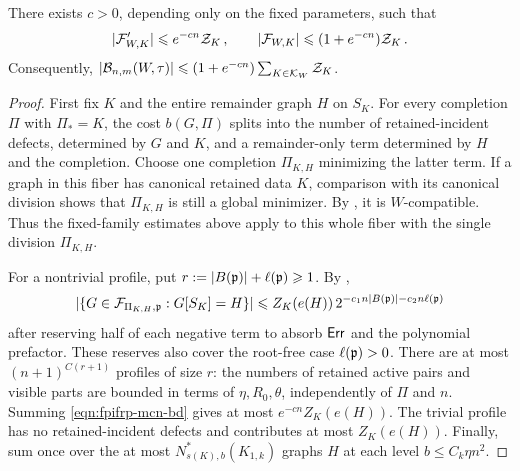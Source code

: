 \begin{lemma}\label{lemma:NtaunmWUpperBdK1k}
There exists $c>0$, depending only on the fixed parameters, such that
$$|{\mathcal F}'_{W,K}|\leqslant e^{-cn}{\mathcal Z}_K\,,\qquad |{\mathcal F}_{W,K}|\leqslant(1+e^{-cn}){\mathcal Z}_K\,.$$
Consequently, $|{\mathcal B}_{n,m}(W,\tau)|\leqslant(1+e^{-cn})\sum_{K\in{\mathcal K}_W}{\mathcal Z}_K$.
\end{lemma}
\begin{proof}
First fix $K$ and the entire remainder graph $H$ on $S_K$. For every completion $\Pi$ with $\Pi_\ast=K$, the cost $b(G,\Pi)$ splits into the number of retained-incident defects, determined by $G$ and $K$, and a remainder-only term determined by $H$ and the completion. Choose one completion $\Pi_{K,H}$ minimizing the latter term. If a graph in this fiber has canonical retained data $K$, comparison with its canonical division shows that $\Pi_{K,H}$ is still a global minimizer. By , it is $W$-compatible. Thus the fixed-family estimates above apply to this whole fiber with the single division $\Pi_{K,H}$.

For a nontrivial profile, put $r:=|B({\mathfrak p})|+\ell({\mathfrak p})\geqslant1$. By ,
\begin{equation}\label{eqn:fpifrp-mcn-bd}
|\{G\in{\mathcal F}_{\Pi_{K,H},{\mathfrak p}}:G[S_K]=H\}|\leqslant Z_K(e(H))\,2^{-c_1n|B({\mathfrak p})|-c_2n\ell({\mathfrak p})}
\end{equation}
after reserving half of each negative term to absorb ${\mathsf{Err}}$ and the polynomial prefactor. These reserves also cover the root-free case $\ell({\mathfrak p})>0$. There are at most $(n+1)^{C(r+1)}$ profiles of size $r$: the numbers of retained active pairs and visible parts are bounded in terms of $\eta,R_0,\theta$, independently of $\Pi$ and $n$. Summing \eqref{eqn:fpifrp-mcn-bd} gives at most $e^{-cn}Z_K(e(H))$. The trivial profile has no retained-incident defects and contributes at most $Z_K(e(H))$. Finally, sum once over the at most $N^\ast_{s(K),b}(K_{1,k})$ graphs $H$ at each level $b\leq C_k\eta n^2$.
\end{proof}

